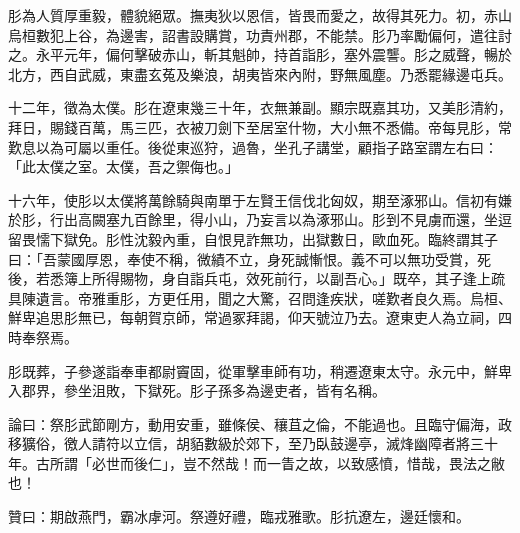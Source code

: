 \begin{pinyinscope}
肜為人質厚重毅，體貌絕眾。撫夷狄以恩信，皆畏而愛之，故得其死力。初，赤山烏桓數犯上谷，為邊害，詔書設購賞，功責州郡，不能禁。肜乃率勵偏何，遣往討之。永平元年，偏何擊破赤山，斬其魁帥，持首詣肜，塞外震讋。肜之威聲，暢於北方，西自武威，東盡玄菟及樂浪，胡夷皆來內附，野無風塵。乃悉罷緣邊屯兵。

十二年，徵為太僕。肜在遼東幾三十年，衣無兼副。顯宗既嘉其功，又美肜清約，拜日，賜錢百萬，馬三匹，衣被刀劍下至居室什物，大小無不悉備。帝每見肜，常歎息以為可屬以重任。後從東巡狩，過魯，坐孔子講堂，顧指子路室謂左右曰：「此太僕之室。太僕，吾之禦侮也。」

十六年，使肜以太僕將萬餘騎與南單于左賢王信伐北匈奴，期至涿邪山。信初有嫌於肜，行出高闕塞九百餘里，得小山，乃妄言以為涿邪山。肜到不見虜而還，坐逗留畏懦下獄免。肜性沈毅內重，自恨見詐無功，出獄數日，歐血死。臨終謂其子曰：「吾蒙國厚恩，奉使不稱，微績不立，身死誠慚恨。義不可以無功受賞，死後，若悉簿上所得賜物，身自詣兵屯，效死前行，以副吾心。」既卒，其子逢上疏具陳遺言。帝雅重肜，方更任用，聞之大驚，召問逢疾狀，嗟歎者良久焉。烏桓、鮮卑追思肜無已，每朝賀京師，常過冢拜謁，仰天號泣乃去。遼東吏人為立祠，四時奉祭焉。

肜既葬，子參遂詣奉車都尉竇固，從軍擊車師有功，稍遷遼東太守。永元中，鮮卑入郡界，參坐沮敗，下獄死。肜子孫多為邊吏者，皆有名稱。

論曰：祭肜武節剛方，動用安重，雖條侯、穰苴之倫，不能過也。且臨守偏海，政移獷俗，徼人請符以立信，胡貊數級於郊下，至乃臥鼓邊亭，滅烽幽障者將三十年。古所謂「必世而後仁」，豈不然哉！而一眚之故，以致感憤，惜哉，畏法之敝也！

贊曰：期啟燕門，霸冰虖河。祭遵好禮，臨戎雅歌。肜抗遼左，邊廷懷和。


\end{pinyinscope}